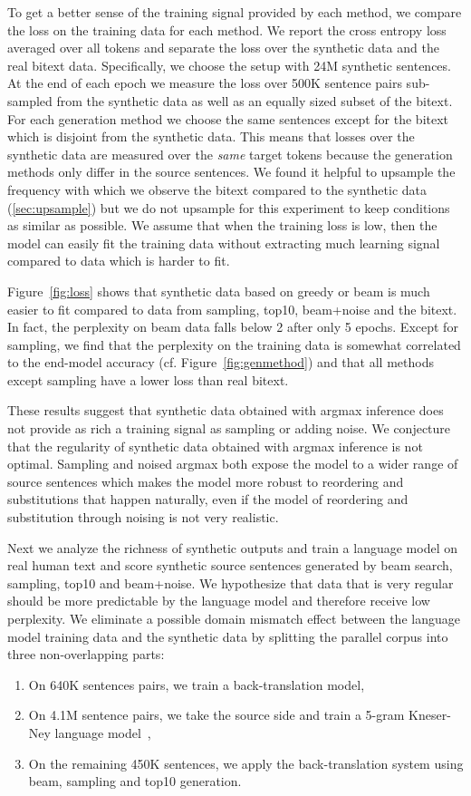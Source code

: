 \documentclass[11pt,a4paper]{article}
\begin{document}
To get a better sense of the training signal provided by each method, we compare the loss on the training data for each method.
We report the cross entropy loss averaged over all tokens and separate the loss over the synthetic data and the real bitext data.
Specifically, we choose the setup with 24M synthetic sentences. At the end of each epoch we measure the loss over 500K sentence pairs sub-sampled from the synthetic data as well as an equally sized subset of the bitext. 
For each generation method we choose the same sentences except for the bitext which is disjoint from the synthetic data.
This means that losses over the synthetic data are measured over the \emph{same} target tokens because the generation methods only differ in the source sentences.
We found it helpful to upsample the frequency with which we observe the bitext compared to the synthetic data (\textsection\ref{sec:upsample}) but we do not upsample for this experiment to keep conditions as similar as possible.
We assume that when the training loss is low, then the model can easily fit the training data without extracting much learning signal compared to data which is harder to fit.


Figure~\ref{fig:loss} shows that synthetic data based on greedy or beam is much easier to fit compared to data from sampling, top10, beam+noise and the bitext.
In fact, the perplexity on beam data falls below 2 after only 5 epochs.
Except for sampling, we find that the perplexity on the training data is somewhat correlated to the end-model accuracy (cf. Figure~\ref{fig:genmethod}) and that all methods except sampling have a lower loss than real bitext.

These results suggest that synthetic data obtained with argmax inference does not provide as rich a training signal as sampling or adding noise. 
We conjecture that the regularity of synthetic data obtained with argmax inference is not optimal.
Sampling and noised argmax both expose the model to a wider range of source sentences which makes the model more robust to reordering and substitutions that happen naturally, even if the model of reordering and substitution through noising is not very realistic.


Next we analyze the richness of synthetic outputs and train a language model on real human text and score synthetic source sentences generated by beam search, sampling, top10 and beam+noise.
We hypothesize that data that is very regular should be more predictable by the language model and therefore receive low perplexity. 
We eliminate a possible domain mismatch effect between the language model training data and the synthetic data by splitting the parallel corpus into three non-overlapping parts:
\begin{enumerate}
\item On 640K sentences pairs, we train a back-translation model,
\item On 4.1M sentence pairs, we take the source side and train a 5-gram Kneser-Ney language model~\citep{heafield:acl:2013}, 
\item On the remaining 450K sentences, we apply the back-translation system using beam, sampling and top10 generation. 
\end{enumerate}
\end{document}
